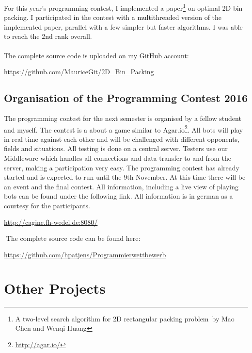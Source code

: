 \documentclass[a4paper, 12pt]{article}
\begin{document}
For this year's programming contest, I implemented a paper\footnote{\glqq A two-level search algorithm for 2D rectangular	packing problem\grqq \ by Mao Chen and Wenqi Huang} on optimal 2D bin packing.
\newline
I participated in the contest with a multithreaded version of the implemented paper, parallel with a few simpler but faster algorithms. I was able to reach the 2nd rank overall.
\\
\\
The complete source code is uploaded on my GitHub account:

\begin{center}
	\url{https://github.com/MauriceGit/2D_Bin_Packing}
\end{center}

\subsection{Organisation of the Programming Contest 2016}\label{agar}

The programming contest for the next semester is organised by a fellow student and myself. 
The contest is a about a game similar to Agar.io\footnote{\url{http://agar.io/}}. All bots will play in real time against each other and will be challenged with different opponents, fields and situations.
\newline
All testing is done on a central server. Testers use our Middleware which handles all connections and data transfer to and from the server, making a participation very easy.
\newline
The programming contest has already started and is expected to run until the 9th November. At this time there will be an event and the final contest.
\newline
All information, including a live view of playing bots can be found under the following link. All information is in german as a courtesy for the participants.

\begin{center}
	\url{http://cagine.fh-wedel.de:8080/}
\end{center} $ $
\newline
The complete source code can be found here:

\begin{center}
	\url{https://github.com/hpatjens/Programmierwettbewerb}
\end{center}


\section{Other Projects}
\end{document}
